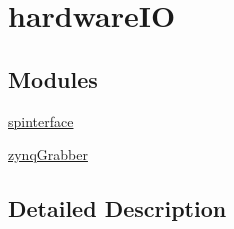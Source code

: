 \hypertarget{group__hardwareIO}{}\section{hardware\+IO}
\label{group__hardwareIO}
\subsection*{Modules}
\begin{DoxyCompactItemize}
\item 
\hyperlink{group__spinterface}{spinterface}
\item 
\hyperlink{group__zynqGrabber}{zynq\+Grabber}
\end{DoxyCompactItemize}


\subsection{Detailed Description}
